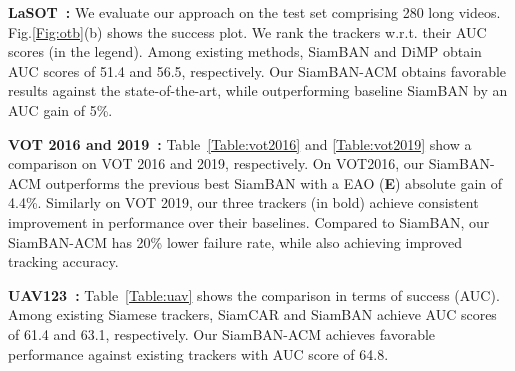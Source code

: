 \documentclass[10pt,twocolumn,letterpaper,final]{cvpr}
\begin{document}
\begin{table}[t]
\fontsize{6.6}{8}\selectfont
\centering
{}
\caption{\textbf{State-of-the-art comparison on UAV123~\cite{mueller2016a}} in terms of success (AUC). The  best  two  results  are  shown  in red  and  blue  fonts,  respectively. } 
\label{Table:uav}
\end{table}



\noindent\textbf{LaSOT~\cite{fan2019lasot}:}
We evaluate our approach on the test set comprising 280 long videos. Fig.\ref{Fig:otb}(b) shows the success plot. We rank the trackers w.r.t. their AUC scores (in the legend). Among existing methods, SiamBAN and DiMP obtain AUC scores of 51.4 and 56.5, respectively. Our SiamBAN-ACM obtains favorable results against the state-of-the-art, while outperforming baseline SiamBAN by an AUC gain of 5\%. 





\noindent\textbf{VOT 2016 and 2019~\cite{VOT_TPAMI}:} 
Table~\ref{Table:vot2016} and \ref{Table:vot2019} show a comparison on VOT 2016 and 2019, respectively. On VOT2016, our SiamBAN-ACM outperforms the previous best SiamBAN with a EAO (\textbf{E}) absolute gain of 4.4\%.
Similarly on VOT 2019, our three trackers (in bold) achieve consistent improvement in performance over their baselines. Compared to SiamBAN, our SiamBAN-ACM has 20\% lower failure rate, while also achieving improved tracking accuracy.  



\noindent\textbf{UAV123~\cite{mueller2016a}:}
Table~\ref{Table:uav} shows the comparison in terms of success (AUC). Among existing Siamese trackers, SiamCAR and SiamBAN achieve AUC scores of 61.4 and 63.1, respectively. Our SiamBAN-ACM achieves favorable performance against existing trackers with AUC score of 64.8.
\end{document}
